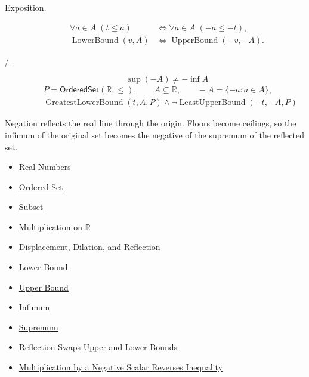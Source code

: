 \begin{remark*}
\begin{description}
  \item[Exposition.]
\[
\begin{aligned}
\forall a\in A\;(t\leq a)
&\Longleftrightarrow
\forall a\in A\;(-a\leq -t),\\
\operatorname{LowerBound}(v,A)
&\Longleftrightarrow
\operatorname{UpperBound}(-v,-A).
\end{aligned}
\]


  \item[ / .]
  \[
\sup(-A)\ne -\inf A
\]
\[
\begin{aligned}
&P=\mathsf{OrderedSet}(\mathbb{R},\leq),\qquad A\subseteq\mathbb{R},\qquad -A=\{-a:a\in A\},\\
&\operatorname{GreatestLowerBound}(t,A,P)\land
\neg\operatorname{LeastUpperBound}(-t,-A,P)
\end{aligned}
\]
\end{description}
\end{remark*}

\begin{remark*}[Interpretation]
Negation reflects the real line through the origin. Floors become ceilings, so the infimum of the original set becomes the negative of the supremum of the reflected set.
\end{remark*}

\begin{dependencies}
\begin{itemize}
  \item \hyperref[def:reals]{Real Numbers}
  \item \hyperref[def:ordered-set]{Ordered Set}
  \item \hyperref[def:subset]{Subset}
  \item \hyperref[def:multiplication-on-r]{Multiplication on $\mathbb{R}$}
  \item \hyperref[def:displacement-dilation-reflection]{Displacement, Dilation, and Reflection}
  \item \hyperref[def:real-lower-bound]{Lower Bound}
  \item \hyperref[def:real-upper-bound]{Upper Bound}
  \item \hyperref[def:infimum]{Infimum}
  \item \hyperref[def:supremum]{Supremum}
  \item \hyperref[cor:reflection-swaps-upper-lower-bounds]{Reflection Swaps Upper and Lower Bounds}
  \item \hyperref[thm:ineq-multiply-negative]{Multiplication by a Negative Scalar Reverses Inequality}
\end{itemize}
\end{dependencies}





